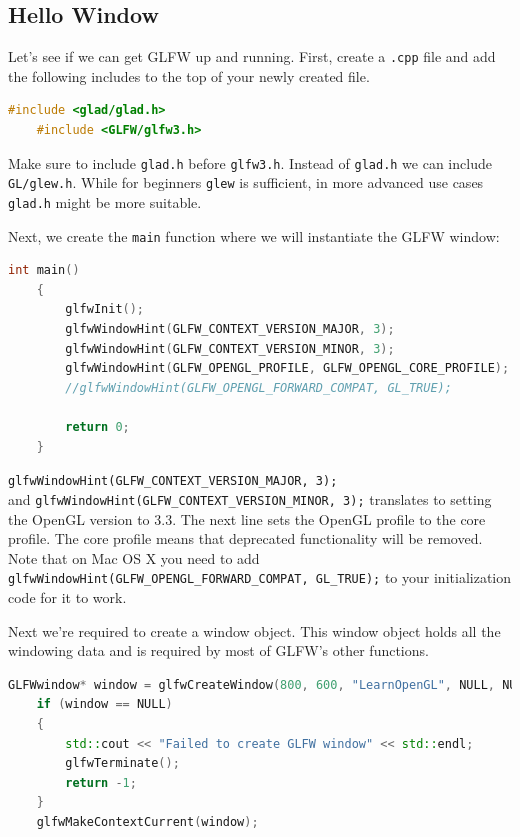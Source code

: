 \subsection{Hello Window}

Let's see if we can get GLFW up and running. First, create a \verb|.cpp| file and add the following includes to the top of your newly created file.

\begin{lstlisting}[language=C++]
    #include <glad/glad.h>
    #include <GLFW/glfw3.h>
\end{lstlisting}

Make sure to include \verb|glad.h| before \verb|glfw3.h|. Instead of \verb|glad.h| we can include \verb|GL/glew.h|. While for beginners \verb|glew| is sufficient, in more advanced use cases \verb|glad.h| might be more suitable.

Next, we create the \verb|main| function where we will instantiate the GLFW window:

\begin{lstlisting}[language=C++]
    int main()
    {
        glfwInit();
        glfwWindowHint(GLFW_CONTEXT_VERSION_MAJOR, 3);
        glfwWindowHint(GLFW_CONTEXT_VERSION_MINOR, 3);
        glfwWindowHint(GLFW_OPENGL_PROFILE, GLFW_OPENGL_CORE_PROFILE);
        //glfwWindowHint(GLFW_OPENGL_FORWARD_COMPAT, GL_TRUE);
    
        return 0;
    }
\end{lstlisting}

\verb|glfwWindowHint(GLFW_CONTEXT_VERSION_MAJOR, 3);| \\ and \verb|glfwWindowHint(GLFW_CONTEXT_VERSION_MINOR, 3);| translates to setting the OpenGL version to 3.3. The next line sets the OpenGL profile to the core profile. The core profile means that deprecated functionality will be removed. Note that on Mac OS X you need to add \\ \verb|glfwWindowHint(GLFW_OPENGL_FORWARD_COMPAT, GL_TRUE);| to your initialization code for it to work.

Next we're required to create a window object. This window object holds all the windowing data and is required by most of GLFW's other functions.

\begin{lstlisting}[language=C++]
    GLFWwindow* window = glfwCreateWindow(800, 600, "LearnOpenGL", NULL, NULL);
    if (window == NULL)
    {
        std::cout << "Failed to create GLFW window" << std::endl;
        glfwTerminate();
        return -1;
    }
    glfwMakeContextCurrent(window);
\end{lstlisting}

